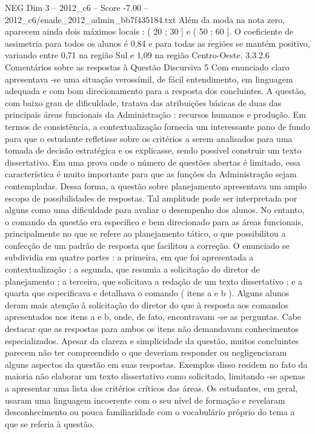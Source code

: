 \begin{textsample}{NEG Dim 3 – 2012\_c6 – Score -7.00 – 2012\_c6/enade\_2012\_admin\_bb7f435184.txt}
Além da moda na nota zero, aparecem ainda dois máximos locais : ( 20 ; 30 ] e ( 50 ; 60 ].
O coeficiente de assimetria para todos os alunos é 0,84 e para todas as regiões se mantém positivo, variando entre 0,71 na região Sul e 1,09 na região Centro-Oeste. 3.3.2.6 Comentários sobre as respostas à Questão Discursiva 5 Com enunciado claro apresentava -se uma situação verossímil, de fácil entendimento, em linguagem adequada e com bom direcionamento para a resposta dos concluintes.
A questão, com baixo grau de dificuldade, tratava das atribuições básicas de duas das principais áreas funcionais da Administração : recursos humanos e produção.
Em termos de consistência, a contextualização fornecia um interessante pano de fundo para que o estudante refletisse sobre os critérios a serem analisados para uma tomada de decisão estratégica e os explicasse, sendo possível construir um texto dissertativo.
Em uma prova onde o número de questões abertas é limitado, essa característica é muito importante para que as funções da Administração sejam contempladas.
Dessa forma, a questão sobre planejamento apresentava um amplo escopo de possibilidades de respostas.
Tal amplitude pode ser interpretada por alguns como uma dificuldade para avaliar o desempenho dos alunos.
No entanto, o comando da questão era específico e bem direcionado para as áreas funcionais, principalmente no que se refere ao planejamento tático, o que possibilitou a confecção de um padrão de resposta que facilitou a correção.
O enunciado se subdividia em quatro partes : a primeira, em que foi apresentada a contextualização ; a segunda, que resumia a solicitação do diretor de planejamento ; a terceira, que solicitava a redação de um texto dissertativo ; e a quarta que especificava e detalhava o comando ( itens a e b ).
Alguns alunos deram mais atenção à solicitação do diretor do que à resposta aos comandos apresentados nos itens a e b, onde, de fato, encontravam -se as perguntas.
Cabe destacar que as respostas para ambos os itens não demandavam conhecimentos especializados.
Apesar da clareza e simplicidade da questão, muitos concluintes parecem não ter compreendido o que deveriam responder ou negligenciaram alguns aspectos da questão em suas respostas.
Exemplos disso residem no fato da maioria não elaborar um texto dissertativo como solicitado, limitando -se apenas a apresentar uma lista dos critérios críticos das áreas.
Os estudantes, em geral, usaram uma linguagem incoerente com o seu nível de formação e revelaram desconhecimento ou pouca familiaridade com o vocabulário próprio do tema a que se referia à questão.

\end{textsample}
